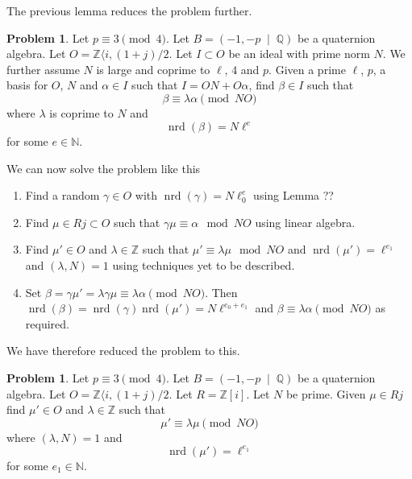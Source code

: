 \documentclass[10pt]{article}
\theoremstyle{plain}
\theoremstyle{definition}
\newtheorem{problem}[theorem]{Problem}
\newcommand{\op}{\operatorname}
\newcommand{\N}{\mathbb{N}}
\newcommand{\Z}{\mathbb{Z}}
\newcommand{\Q}{\mathbb{Q}}
\newcommand{\nrd}{\op{nrd}}
\begin{document}
The previous lemma reduces the problem further.

\begin{problem} \label{prob: solve congruence}
Let \( p \equiv 3 \pmod{4} \).
Let \( B =  (-1, -p \; \mid \; \Q) \) be a quaternion algebra.
Let \( O = \Z \langle i, (1+j) / 2 \).
Let \( I \subset O \) be an ideal with prime norm \( N \).
We further assume \( N \) is large and coprime to \( \ell \), 4 and \( p \).
Given a prime \( \ell \), \( p \), a basis for \( O \), \( N \) and \( \alpha \in I \) such that \( I = ON + O\alpha \), find \( \beta \in I \) such that
\[
    \beta \equiv \lambda \alpha \pmod{NO}
\]
where \(\lambda \) is coprime to \( N \) and
\[
    \nrd(\beta) = N\ell^e
\]
for some \( e \in \N \).
\end{problem}

We can now solve the problem like this
\begin{enumerate}
    \item
          Find a random \( \gamma \in O \) with \( \nrd(\gamma) = N \ell^e_0 \) using Lemma ??
    \item
          Find \( \mu \in Rj \subset  O \) such that \( \gamma\mu \equiv \alpha \mod NO \) using linear algebra.
    \item
          Find \( \mu' \in  O \) and \( \lambda \in \Z \) such that \( \mu' \equiv \lambda \mu \mod NO \) and \( \nrd(\mu') = \ell^{e_1} \) and \( (\lambda, N) = 1 \) using techniques yet to be described.
    \item
          Set \( \beta = \gamma \mu' = \lambda\gamma\mu \equiv \lambda \alpha \pmod{NO} \). Then \( \nrd(\beta) = \nrd(\gamma)\nrd(\mu') = N\ell^{e_0 + e_1}\) and \( \beta \equiv \lambda \alpha \pmod{NO} \) as required.
\end{enumerate}

We have therefore reduced the problem to this.
\begin{problem}
Let \( p \equiv 3 \pmod{4} \).
Let \( B =  (-1, -p \; \mid \; \Q) \) be a quaternion algebra.
Let \( O = \Z \langle i, (1+j) / 2 \).
Let \( R = \Z[i] \).
Let \( N \) be prime.
Given \( \mu \in Rj \) find \( \mu' \in O \) and \(\lambda \in \Z \) such that
\[
    \mu' \equiv \lambda \mu \pmod{NO}
\]
where \( (\lambda, N) = 1 \) and
\[
    \nrd(\mu') = \ell^{e_1}
\]
for some \( e_1 \in \N \).
\end{problem}
\end{document}
